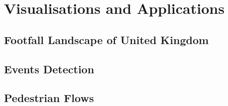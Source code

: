 \chapter{Visualisations and Applications}

\section{Footfall Landscape of United Kingdom}

\section{Events Detection}

\section{Pedestrian Flows}
